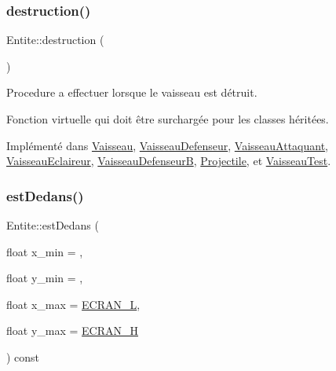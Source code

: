 \subsubsection{\texorpdfstring{destruction()}{destruction()}}
{\footnotesize\ttfamily Entite\+::destruction (\begin{DoxyParamCaption}{ }\end{DoxyParamCaption})\hspace{0.3cm}{\ttfamily [pure virtual]}}



Procedure a effectuer lorsque le vaisseau est détruit. 

Fonction virtuelle qui doit être surchargée pour les classes héritées. 

Implémenté dans \hyperlink{class_vaisseau_af4f490c5fd9e171b23067ec73aa737ad}{Vaisseau}, \hyperlink{class_vaisseau_defenseur_a6816d325d737269cddc6310e7f68b222}{Vaisseau\+Defenseur}, \hyperlink{class_vaisseau_attaquant_af804e1fd491301c2385e10d88f4892a6}{Vaisseau\+Attaquant}, \hyperlink{class_vaisseau_eclaireur_a4f65343b67301d7fa98f5e02337cc1e1}{Vaisseau\+Eclaireur}, \hyperlink{class_vaisseau_defenseur_b_aba88319dcc7540dce39c164fa9853732}{Vaisseau\+DefenseurB}, \hyperlink{class_projectile_aac0afd5bf761f0e212d4e1c8a503c86a}{Projectile}, et \hyperlink{class_vaisseau_test_a5b8b67886ecb73d8f720f8499ef3c378}{Vaisseau\+Test}.

\mbox{\label{class_entite_a0861182f1af724c8b5fd70b30720fa04}} 
\subsubsection{\texorpdfstring{est\+Dedans()}{estDedans()}}
{\footnotesize\ttfamily Entite\+::est\+Dedans (\begin{DoxyParamCaption}\item[{float}]{x\+\_\+min = {},  }\item[{float}]{y\+\_\+min = {},  }\item[{float}]{x\+\_\+max = {\ttfamily \hyperlink{constantes_8h_a078285dfdd5f8d9caa79aeb3f4eb0a1f}{E\+C\+R\+A\+N\+\_\+L}},  }\item[{float}]{y\+\_\+max = {\ttfamily \hyperlink{constantes_8h_a75c426da06c2ec9164baaf36a262fa07}{E\+C\+R\+A\+N\+\_\+H}} }\end{DoxyParamCaption}) const}



